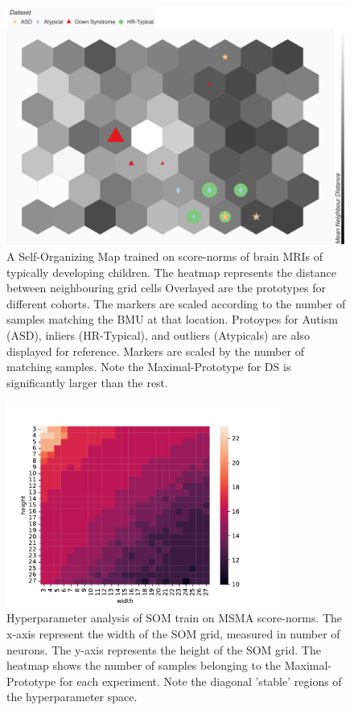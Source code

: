 \begin{figure}[tbhp]
\centering
\includegraphics[width=\textwidth]{figures/som_9x7.png}
\caption{A Self-Organizing Map trained on score-norms of brain MRIs of typically developing children. The heatmap represents the distance between neighbouring grid cells
Overlayed are the prototypes for different cohorts.
The markers are scaled according to the number of samples matching the BMU at that location. Protoypes for Autism (ASD), inliers (HR-Typical), and outliers (Atypicals) are also displayed for reference. Markers are scaled by the number of matching samples. Note the Maximal-Prototype for DS is significantly larger than the rest. 
}
\label{fig:som-abcd}
\end{figure}

\begin{figure}[tbhp]
\centering
\includegraphics[width=0.8\textwidth]{figures/som_stability.pdf}
\caption{Hyperparameter analysis of SOM train on MSMA score-norms. The x-axis represent the width of the SOM grid, measured in number of neurons. The y-axis represents the height of the SOM grid. The heatmap shows the number of samples belonging to the Maximal-Prototype for each experiment. Note the diagonal 'stable' regions of the hyperparameter space.}
\label{fig:som-hparams}
\end{figure}

